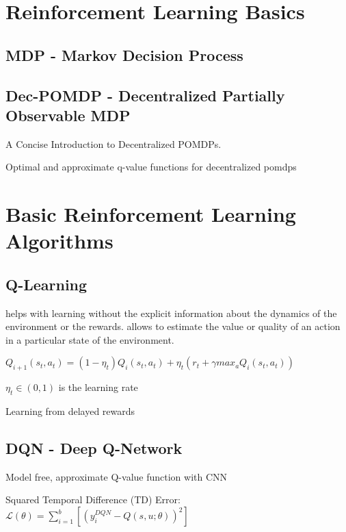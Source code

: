 \section{Reinforcement Learning Basics}

\subsection{MDP - Markov Decision Process}

\subsection{Dec-POMDP - Decentralized Partially Observable MDP}
A Concise Introduction to Decentralized POMDPs.

Optimal and approximate q-value functions for decentralized pomdps

\section{Basic Reinforcement Learning Algorithms}


\subsection{Q-Learning}

helps with learning without the explicit information about the dynamics of the environment or the rewards. allows to estimate the value or quality of an action in a particular state of the environment.

\begin{center}
	$ Q_{i+1}(s_t, a_t)= (1-\eta_t)Q_i(s_t, a_t) +\eta_t(r_t+\gamma max_aQ_i(s_t, a_t))$
	
		$ \eta_t \in (0,1)$ is the learning rate
\end{center}


Learning from delayed rewards

\subsection{DQN - Deep Q-Network}

Model free, approximate Q-value function with CNN

\begin{center}
	Squared Temporal Difference (TD) Error:
	$ \mathcal{L}(\theta) = \sum_{i=1}^b [(y_i^{DQN} - Q(s,u;\theta))^2]$
\end{center}

